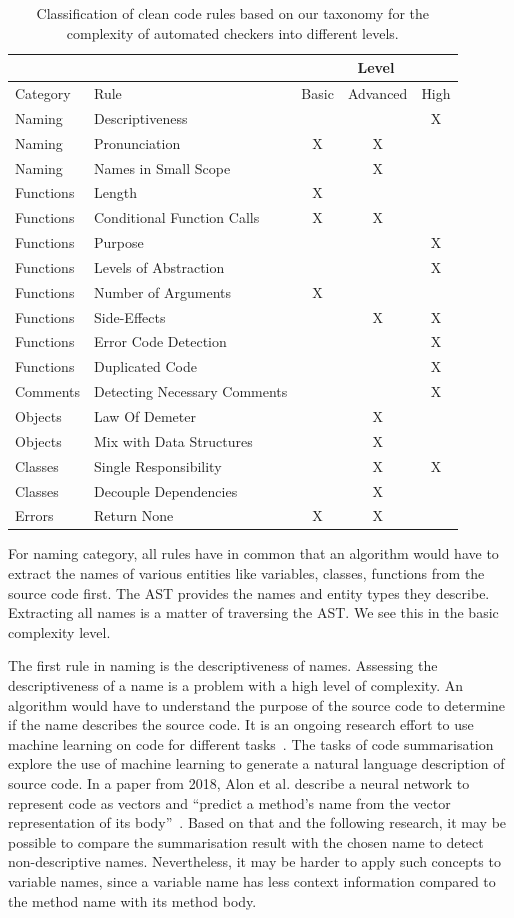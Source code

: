 \begin{table}[h]
\begin{tabularx}{\textwidth}{XXccc}
\toprule
&     & \multicolumn{3}{c}{Level} \\ \midrule
Category&Rule & Basic  & Advanced  & High \\ \midrule
Naming&Descriptiveness&&& X\\
Naming&Pronunciation&X&X& \\
Naming&Names in Small Scope&&X& \\
Functions&Length&X&&\\
Functions&Conditional Function Calls&X&X& \\
Functions&Purpose&&&X\\
Functions&Levels of Abstraction&&&X\\
Functions&Number of Arguments&X&& \\
Functions&Side-Effects&&X&X\\
Functions&Error Code Detection&&&X \\
Functions&Duplicated Code&&&X \\
Comments&Detecting Necessary Comments&&&X \\
Objects&Law Of Demeter&&X& \\
Objects&Mix with Data Structures&&X& \\
Classes&Single Responsibility&&X&X \\
Classes&Decouple Dependencies&&X& \\
Errors&Return None&X&X& \\
\bottomrule
\end{tabularx}
\caption{Classification of clean code rules based on our taxonomy for the complexity of automated checkers into different levels.}
\label{tab:complexity_level_overview}
\end{table}


For naming category, all rules have in common that an algorithm would have to extract the names of various entities like variables, classes, functions from the source code first. The AST provides the names and entity types they describe. Extracting all names is a matter of traversing the AST. We see this in the basic complexity level.

The first rule in naming is the descriptiveness of names. Assessing the descriptiveness of a name is a problem with a high level of complexity. An algorithm would have to understand the purpose of the source code to determine if the name describes the source code. It is an ongoing research effort to use machine learning on code for different tasks~\cite{allamanis_survey_2018}. The tasks of code summarisation explore the use of machine learning to generate a natural language description of source code. In a paper from 2018, Alon et al. describe a neural network to represent code as vectors and \enquote{predict a method’s name from the vector representation of its body}~\cite{alon_code2vec_2018}. Based on that and the following research, it may be possible to compare the summarisation result with the chosen name to detect non-descriptive names. Nevertheless, it may be harder to apply such concepts to variable names, since a variable name has less context information compared to the method name with its method body.

